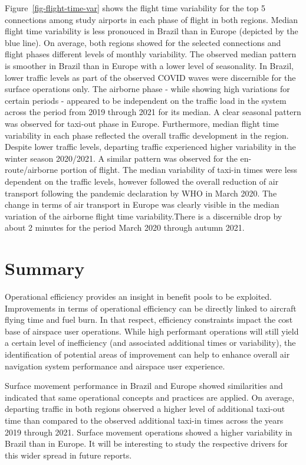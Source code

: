 \documentclass[
  a4paper,
  DIV=11,
  numbers=noendperiod]{scrreprt}
\begin{document}
Figure~\ref{fig-flight-time-var} shows the flight time variability for
the top 5 connections among study airports in each phase of flight in
both regions. Median flight time variability is less pronouced in Brazil
than in Europe (depicted by the blue line). On average, both regions
showed for the selected connections and flight phases different levels
of monthly variability. The observed median pattern is smoother in
Brazil than in Europe with a lower level of seasonality. In Brazil,
lower traffic levels as part of the observed COVID waves were
discernible for the surface operations only. The airborne phase - while
showing high variations for certain periods - appeared to be independent
on the traffic load in the system across the period from 2019 through
2021 for its median. A clear seasonal pattern was observed for taxi-out
phase in Europe. Furthermore, median flight time variability in each
phase reflected the overall traffic development in the region. Despite
lower traffic levels, departing traffic experienced higher variability
in the winter season 2020/2021. A similar pattern was observed for the
en-route/airborne portion of flight. The median variability of taxi-in
times were less dependent on the traffic levels, however followed the
overall reduction of air transport following the pandemic declaration by
WHO in March 2020. The change in terms of air transport in Europe was
clearly visible in the median variation of the airborne flight time
variability.There is a discernible drop by about 2 minutes for the
period March 2020 through autumn 2021.

\hypertarget{summary-4}{%
\section{Summary}\label{summary-4}}

Operational efficiency provides an insight in benefit pools to be
exploited. Improvements in terms of operational efficiency can be
directly linked to aircraft flying time and fuel burn. In that respect,
efficiency constraints impact the cost base of airspace user operations.
While high performant operations will still yield a certain level of
inefficiency (and associated additional times or variability), the
identification of potential areas of improvement can help to enhance
overall air navigation system performance and airspace user experience.

Surface movement performance in Brazil and Europe showed similarities
and indicated that same operational concepts and practices are applied.
On average, departing traffic in both regions observed a higher level of
additional taxi-out time than compared to the observed additional
taxi-in times across the years 2019 through 2021. Surface movement
operations showed a higher variability in Brazil than in Europe. It will
be interesting to study the respective drivers for this wider spread in
future reports.
\end{document}
